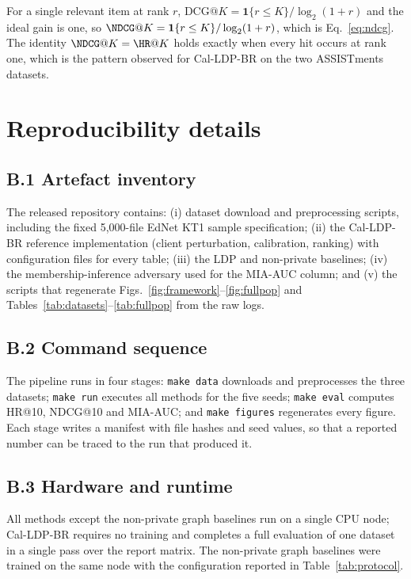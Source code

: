 For a single relevant item at rank $r$, $\mathrm{DCG}@K=\mathbf 1\{r\le K\}/\log_2(1+r)$ and the ideal gain is one, so $\NDCG@K=\mathbf 1\{r\le K\}/\log_2(1+r)$, which is Eq.~\eqref{eq:ndcg}. The identity $\NDCG@K=\HR@K$ holds exactly when every hit occurs at rank one, which is the pattern observed for Cal-LDP-BR on the two ASSISTments datasets.

\section{Reproducibility details}\label{app:repro}

\subsection*{B.1 Artefact inventory}

The released repository contains: (i) dataset download and preprocessing scripts, including the fixed 5{,}000-file EdNet KT1 sample specification; (ii) the Cal-LDP-BR reference implementation (client perturbation, calibration, ranking) with configuration files for every table; (iii) the LDP and non-private baselines; (iv) the membership-inference adversary used for the MIA-AUC column; and (v) the scripts that regenerate Figs.~\ref{fig:framework}--\ref{fig:fullpop} and Tables~\ref{tab:datasets}--\ref{tab:fullpop} from the raw logs.

\subsection*{B.2 Command sequence}

The pipeline runs in four stages: \texttt{make data} downloads and preprocesses the three datasets; \texttt{make run} executes all methods for the five seeds; \texttt{make eval} computes HR@10, NDCG@10 and MIA-AUC; and \texttt{make figures} regenerates every figure. Each stage writes a manifest with file hashes and seed values, so that a reported number can be traced to the run that produced it.

\subsection*{B.3 Hardware and runtime}

All methods except the non-private graph baselines run on a single CPU node; Cal-LDP-BR requires no training and completes a full evaluation of one dataset in a single pass over the report matrix. The non-private graph baselines were trained on the same node with the configuration reported in Table~\ref{tab:protocol}.





